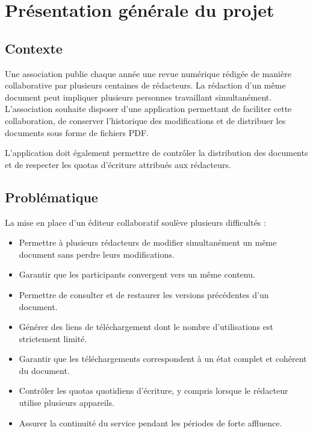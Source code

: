 \chapter{Présentation générale du projet}

\section{Contexte}

Une association publie chaque année une revue numérique rédigée de manière collaborative par plusieurs centaines de rédacteurs. La rédaction d'un même document peut impliquer plusieurs personnes travaillant simultanément. L'association souhaite disposer d'une application permettant de faciliter cette collaboration, de conserver l'historique des modifications et de distribuer les documents sous forme de fichiers PDF.

\begin{infobox}
L'application doit également permettre de contrôler la distribution des documents et de respecter les quotas d'écriture attribués aux rédacteurs.
\end{infobox}

\section{Problématique}

La mise en place d'un éditeur collaboratif soulève plusieurs difficultés :

\begin{itemize}
    \item Permettre à plusieurs rédacteurs de modifier simultanément un même document sans perdre leurs modifications.
    \item Garantir que les participants convergent vers un même contenu.
    \item Permettre de consulter et de restaurer les versions précédentes d'un document.
    \item Générer des liens de téléchargement dont le nombre d'utilisations est strictement limité.
    \item Garantir que les téléchargements correspondent à un état complet et cohérent du document.
    \item Contrôler les quotas quotidiens d'écriture, y compris lorsque le rédacteur utilise plusieurs appareils.
    \item Assurer la continuité du service pendant les périodes de forte affluence.
\end{itemize}

